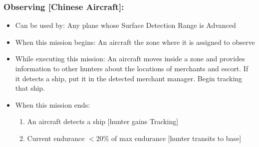 \documentclass{article}
\begin{document}
    \subsubsection{Observing [Chinese Aircraft]:}
            \begin{itemize}
                \item{Can be used by:} Any plane whose Surface Detection Range is Advanced
                \item{When this mission begins:} An aircraft the zone where it is assigned to observe
                \item{While executing this mission:} An aircraft moves inside a zone and provides information to other hunters about the locations of merchants and escort. If it detects a ship, put it in the detected merchant manager. Begin tracking that ship.
                \item{When this mission ends:} 
                \begin{enumerate}[label=\arabic*)]
                    \item An aircraft  detects a ship
                    [hunter gains Tracking]
                    \item Current endurance $<$20\% of max endurance [hunter transits to base]
                \end{enumerate}
            \end{itemize}
\end{document}
